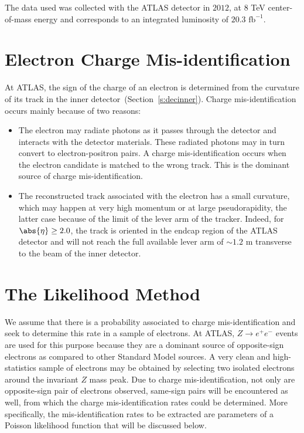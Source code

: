 The data used was collected with the ATLAS detector in $2012$, at $8$ TeV
center-of-mass energy and corresponds to an integrated luminosity of $20.3$
$\text{fb}^{-1}$.

\section{Electron Charge Mis-identification}\label{s:chargereasons}

At ATLAS, the sign of the charge of an electron is determined from the
curvature of its track in the inner detector~(Section~\ref{s:decinner}). Charge
mis-identification occurs mainly because of two reasons:

\begin{itemize}

	\item The electron may radiate photons as it passes through the detector and
	      interacts with the detector materials. These radiated photons may in turn
	      convert to electron-positron pairs. A charge mis-identification occurs when the
	      electron candidate is matched to the wrong track. This is
	      the dominant source of charge mis-identification.

	\item The reconstructed track associated with the electron has a small
	      curvature, which may happen at very high momentum or at large pseudorapidity,
	      the latter case because of the limit of the lever arm of the tracker. Indeed,
	      for $\abs{\eta}\geq 2.0$, the track is oriented in the endcap region of the
	      ATLAS detector and will not reach the full available lever arm of $\sim 1.2$
	      m transverse to the beam of the inner detector.

\end{itemize}

\section{The Likelihood Method}\label{s:cllhmethod}

We assume that there is a probability associated to charge mis-identification
and seek to determine this rate in a sample of electrons. At ATLAS, $Z\to
e^+e^-$ events are used for this purpose because they are a dominant source of
opposite-sign electrons as compared to other Standard Model sources. A very
clean and high-statistics sample of electrons may be obtained by selecting two
isolated electrons around the invariant $Z$ mass peak. Due to charge
mis-identification, not only are opposite-sign pair of electrons observed,
same-sign pairs will be encountered as well, from which the charge
mis-identification rates could be determined. More specifically, the
mis-identification rates to be extracted are parameters of a Poisson likelihood
function that will be discussed below.

